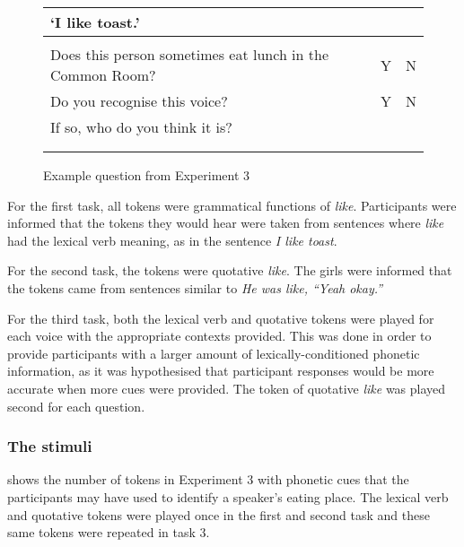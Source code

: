 \begin{figure}

		\begin{tabular}{lrr}
\lsptoprule
`I like toast.'  & & \\
\midrule
\\
Does this person sometimes eat lunch in the Common Room?	 & Y	& N \\

Do you recognise this voice?		& Y	& N \\

If so, who do you think it is? & & \\

                   \\	
		\lspbottomrule
		\end{tabular}
\caption{Example question from Experiment 3}
\label{ExampleExp3}
\end{figure}


For the first task, all tokens were grammatical functions of \textit{like}. Participants were informed that the tokens they would hear were taken from sentences where \textit{like} had the lexical verb meaning, as in the sentence \textit{I like toast}.  

\newpage
For the second task, the tokens were quotative \textit{like}. The girls were informed that the tokens came from sentences similar to \textit{He was like, ``Yeah okay.''} 

For the third task, both the lexical verb and quotative tokens were played for each voice with the appropriate contexts provided. This was done in order to provide participants with a larger amount of lexically-conditioned phonetic information, as it was hypothesised that participant responses would be more accurate when more cues were provided. The token of quotative \textit{like} was played second for each question.

\subsubsection{The stimuli}

 shows the number of tokens in Experiment 3 with phonetic cues that the participants may have used to identify a speaker's eating place. The lexical verb and quotative tokens were played once in the first and second task and these same tokens were repeated in task 3.


